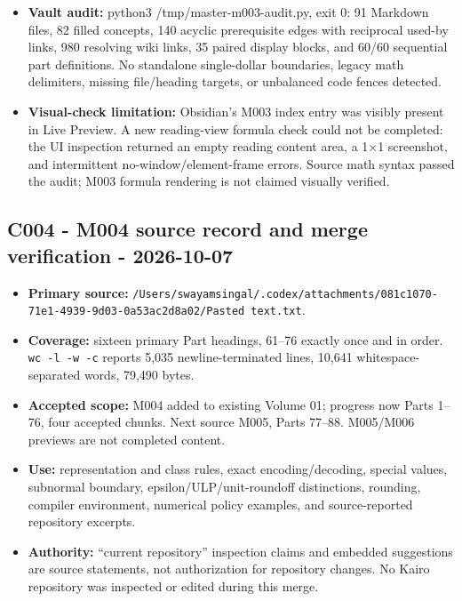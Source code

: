 \begin{itemize}
\item
  \textbf{Vault audit:} python3 /tmp/master-m003-audit.py, exit 0: 91 Markdown files, 82 filled concepts, 140 acyclic prerequisite edges with reciprocal used-by links, 980 resolving wiki links, 35 paired display blocks, and 60/60 sequential part definitions. No standalone single-dollar boundaries, legacy math delimiters, missing file/heading targets, or unbalanced code fences detected.
\item
  \textbf{Visual-check limitation:} Obsidian's M003 index entry was visibly present in Live Preview. A new reading-view formula check could not be completed: the UI inspection returned an empty reading content area, a 1×1 screenshot, and intermittent no-window/element-frame errors. Source math syntax passed the audit; M003 formula rendering is not claimed visually verified.
\end{itemize}

\subsection{C004 - M004 source record and merge verification - 2026-10-07}\label{appendix-a103e7846d21-c004---m004-source-record-and-merge-verification---2026-10-07}

\begin{itemize}
\tightlist
\item
  \textbf{Primary source:} \texttt{/Users/swayamsingal/.codex/attachments/081c1070-71e1-4939-9d03-0a53ac2d8a02/Pasted\ text.txt}.
\item
  \textbf{Coverage:} sixteen primary Part headings, 61--76 exactly once and in order. \texttt{wc\ -l\ -w\ -c} reports 5,035 newline-terminated lines, 10,641 whitespace-separated words, 79,490 bytes.
\item
  \textbf{Accepted scope:} M004 added to existing Volume 01; progress now Parts 1--76, four accepted chunks. Next source M005, Parts 77--88. M005/M006 previews are not completed content.
\item
  \textbf{Use:} representation and class rules, exact encoding/decoding, special values, subnormal boundary, epsilon/ULP/unit-roundoff distinctions, rounding, compiler environment, numerical policy examples, and source-reported repository excerpts.
\item
  \textbf{Authority:} ``current repository'' inspection claims and embedded suggestions are source statements, not authorization for repository changes. No Kairo repository was inspected or edited during this merge.
\end{itemize}


